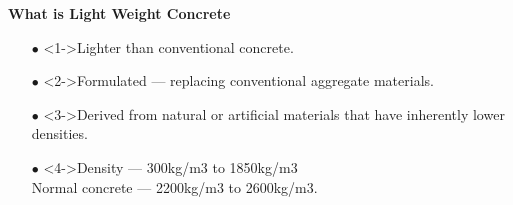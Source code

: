 \documentclass[aspectratio=169]{beamer}
\begin{document}
  \begin{frame}{\textbf{What is Light Weight Concrete}}
      \begin{itemize}
          \large\item[$\bullet$] <1->Lighter than conventional concrete.
           \vspace{0.5cm}
          \large\item[$\bullet$]<2->Formulated --- replacing conventional aggregate materials.
           \vspace{0.5cm}
          \large\item[$\bullet$] <3->Derived from natural or artificial materials that have inherently lower densities.
         \vspace{0.5cm}
         \item[$\bullet$]<4->Density --- 300kg/m3 to 1850kg/m3 \\ Normal concrete --- 2200kg/m3 to 2600kg/m3.
          \end{itemize}
  \end{frame}
\end{document}
